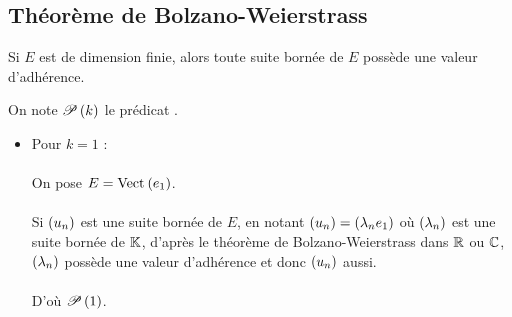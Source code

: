 \subsection{Théorème de Bolzano-Weierstrass}

\begin{theo}
Si \(E\) est de dimension finie, alors toute suite bornée de \(E\) possède une valeur d'adhérence.
\end{theo}

\begin{dem}
On note \(\P{k}\) le prédicat .

\begin{itemize}
    \item Pour \(k=1\) : \\\\ On pose \(E=\Vect{e_1}\). \\\\ Si \(\paren{u_n}\) est une suite bornée de \(E\), en notant \(\paren{u_n}=\paren{\lambda_ne_1}\) où \(\paren{\lambda_n}\) est une suite bornée de \(\K\), d'après le théorème de Bolzano-Weierstrass dans \(\R\) ou \(\C\), \(\paren{\lambda_n}\) possède une valeur d'adhérence et donc \(\paren{u_n}\) aussi. \\\\ D'où \(\P{1}\). \\

\end{itemize}
\end{dem}
